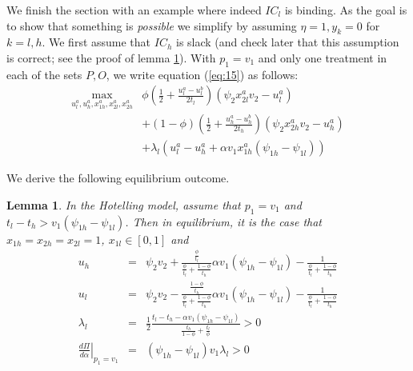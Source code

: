 \documentclass[12pt,english,a4paper]{article}
\newtheorem{lemma}{Lemma}
\begin{document}
We finish the section with an example where indeed \(IC_l\) is binding. As the goal is to show that something is \emph{possible} we simplify by assuming \(\eta=1,y_k=0\) for \(k=l,h\). We first assume that \(IC_h\) is slack (and check later that this assumption is correct; see the proof of lemma \ref{lem:hotelling}). With \(p_1=v_1\) and only one treatment in each of the sets \(P,O\), we write equation (\ref{eq:15}) as follows:
\begin{equation}
\label{eq:20}
\begin{split}
\max_{u_l^a,u_h^a,x_{1h}^a,x_{2l}^a,x_{2h}^a} & \phi \left(\frac{1}{2} + \frac{u_l^a-u_l^b}{2t_l} \right) (\psi_2 x_{2l}^a v_2 -u_l^a) \\
     & + (1-\phi) \left(\frac{1}{2} + \frac{u_h^a-u_h^b}{2t_h} \right) (\psi_2 x_{2h}^a v_2 -u_h^a) \\
     & + \lambda_l (u_l^a - u_h^a + \alpha v_1 x_{1h}^a (\psi_{1h}-\psi_{1l}))
\end{split}
\end{equation}

We derive the following equilibrium outcome.
\begin{lemma} \label{lem:hotelling}
In the Hotelling model, assume that $p_1 =v_1$ and $t_l - t_h > v_1 (\psi_{1h}-\psi_{1l})$. Then in equilibrium, it is the case that $x_{1h}=x_{2h}=x_{2l}=1$, $x_{1l} \in [0,1]$ and
\begin{eqnarray}
\label{eq:21}
u_h &=& \psi_2 v_2 + \frac{\frac{\phi}{t_l}}{\frac{\phi}{t_l}+\frac{1-\phi}{t_h}}\alpha v_1 (\psi_{1h}-\psi_{1l})- \frac{1}{\frac{\phi}{t_l}+\frac{1-\phi}{t_h}}  \\
\label{eq:21b}
u_l &=& \psi_2 v_2 - \frac{\frac{1-\phi}{t_h}}{\frac{\phi}{t_l}+\frac{1-\phi}{t_h}}\alpha v_1 (\psi_{1h}-\psi_{1l})- \frac{1}{\frac{\phi}{t_l}+\frac{1-\phi}{t_h}}  \\
\label{eq:21c}
\lambda_{l} &=& \frac{1}{2} \frac{t_l-t_h-\alpha v_1 (\psi_{1h}-\psi_{1l})}{\frac{t_h}{1-\phi}+\frac{t_l}{\phi}} > 0 \\
\label{eq:21d}
\left. \frac{d\Pi}{d\alpha}\right|_{p_1=v_1} &=& (\psi_{1h}-\psi_{1l}) v_1 \lambda_l > 0
\end{eqnarray}
\end{lemma}
\end{document}
